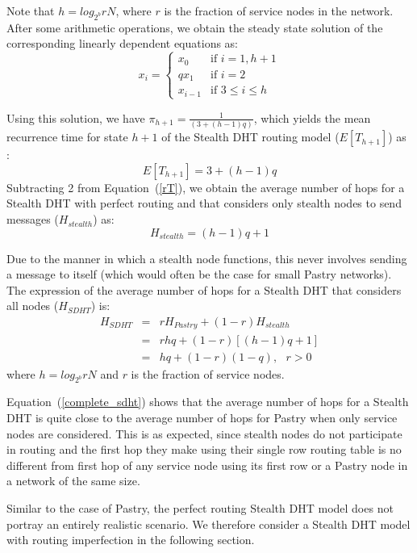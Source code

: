 \documentclass[10pt,twocolumn]{article}
\begin{document}
Note that $h  = log_{2^b}rN$, where $r$ is the fraction of service nodes in the
network. After some arithmetic operations, we obtain the steady state solution
of the corresponding linearly dependent equations as:
\[x_i = \left\{ \begin{array}{ll}
         x_0  & \mbox{if $i = 1,h+1$}\\
         qx_1 & \mbox{if $i = 2$} \\
         x_{i-1} & \mbox{if  $3 \le i \le h$} \end{array} \right. \]

Using this solution, we have $\pi_{h+1} = \frac{1}{(3+(h-1)q)}$, which yields
the mean recurrence time for state $h+1$ of the Stealth DHT routing model
($E[T_{h+1}]$) as :
\begin{equation}
\label{rT} E[T_{h+1}] = 3 + (h-1)q
\end{equation}
Subtracting 2 from Equation~(\ref{rT}), we obtain the average number of hops
for a Stealth DHT with perfect routing and that considers only stealth nodes to
send messages ($H_{stealth}$) as:
\begin{equation}
\label{Hs} H_{stealth} = (h-1)q + 1
\end{equation}

Due to the manner in which a stealth node functions, this never involves
sending a message to itself (which would often be the case for small Pastry
networks). The expression of the average number of hops for a Stealth DHT that
considers all nodes ($H_{SDHT}$) is:
\begin{eqnarray}
\nonumber
 H_{SDHT} &=& rH_{Pastry}  +  (1-r)H_{stealth} \\
\nonumber
 &=& rhq + (1-r)[(h-1)q + 1]\\
\label{complete_sdht}
 &=& hq  + (1-r)(1-q), \mbox{ $r > 0$}
\end{eqnarray}
where $h = log_{2^b}rN$ and $r$ is the fraction of service nodes.

Equation~(\ref{complete_sdht}) shows that the average number of hops for a
Stealth DHT is quite close to the average number of hops for Pastry when only
service nodes are considered. This is as expected, since stealth nodes do not
participate in routing and the first hop they make using their single row
routing table is no different from first hop of any service node using its
first row or a Pastry node in a network of the same size.

Similar to the case of Pastry, the perfect routing Stealth DHT model does not
portray an entirely realistic scenario. We therefore consider a Stealth DHT
model with routing imperfection in the following section.
\end{document}

